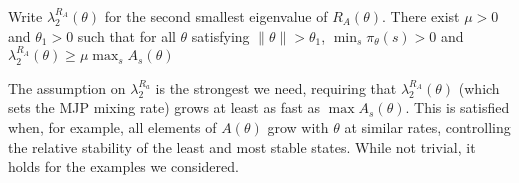 \begin{assumption}
  Write $\lambda^{R_A}_2(\theta)$ for the second smallest eigenvalue of
    $R_A(\theta)$. There exist $\mu > 0$ and $\theta_1 > 0$
    such that for all $\theta$ satisfying $ \| \theta \|> \theta_1$, 
    $\min_s \pi_\theta(s) > 0$ and 
    $ \lambda^{R_A}_2(\theta) \geq \mu \max_s A_s(\theta)$
  \label{asmp:cond_num}
\end{assumption} 
\noindent %
The assumption on $\lambda^{R_a}_2$ is the strongest we need, requiring that 
$\lambda^{R_A}_2(\theta)$ (which sets the MJP mixing rate) grows 
at least as fast as $\max A_s(\theta)$. 
This is satisfied when, for example, all elements of $A(\theta)$ grow 
with $\theta$ at similar rates, controlling the relative stability of 
the least and most stable states.
While not trivial, it holds for the examples we 
considered. %
